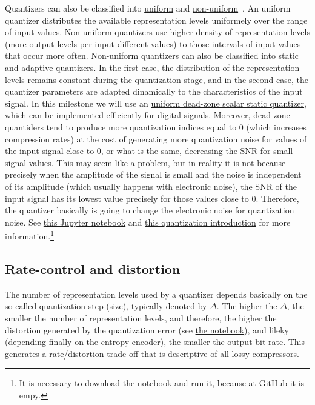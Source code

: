 Quantizers can also be classified into
\href{https://en.wikipedia.org/wiki/Quantization_(signal_processing)#Mid-riser_and_mid-tread_uniform_quantizers}{uniform}
and
\href{https://nptel.ac.in/content/storage2/courses/117104069/chapter_5/5_5.html}{non-uniform}~\cite{sayood2017introduction,vetterli2014foundations}. An
uniform quantizer distributes the available representation levels
uniformely over the range of input values. Non-uniform quantizers use
higher density of representation levels (more output levels per input
different values) to those intervals of input values that occur more
often. Non-uniform quantizers can also be classified into static and
\href{https://en.wikipedia.org/wiki/Adaptive_differential_pulse-code_modulation}{adaptive
  quantizers}. In the first case, the
\href{https://en.wikipedia.org/wiki/Probability_distribution}{distribution}
of the representation levels remains constant during the quantization
stage, and in the second case, the quantizer parameters are adapted
dinamically to the characteristics of the input signal. In this
milestone we will use an
\href{https://en.wikipedia.org/wiki/Quantization_(signal_processing)#Dead-zone_quantizers}{uniform
  dead-zone scalar static quantizer}, which can be implemented
efficiently for digital signals. Moreover, dead-zone quantiders tend
to produce more quantization indices equal to 0 (which increases
compression rates) at the cost of generating more quantization noise
for values of the input signal close to 0, or what is the same,
decreasing the \href{https://en.wikipedia.org/wiki/Signal-to-noise_ratio}{SNR} for small signal values. This may seem like a
problem, but in reality it is not because precisely when the amplitude
of the signal is small and the noise is independent of its amplitude
(which usually happens with electronic noise), the SNR of the input
signal has its lowest value precisely for those values close to
0. Therefore, the quantizer basically is going to change the
electronic noise for quantization noise. See
\href{https://github.com/vicente-gonzalez-ruiz/quantization/blob/master/digital_quantization.ipynb}{this
  Jupyter notebook}
and \href{https://vicente-gonzalez-ruiz.github.io/quantization/}{this
quantization introduction} for more information.\footnote{It is
necessary to download the notebook and run it, because at GitHub it is
empy.}


\subsection{Rate-control and distortion}
The number of representation levels used by a quantizer depends
basically on the so called quantization step (size), typically denoted by
$\Delta$. The higher the $\Delta$, the smaller the number of
representation levels, and therefore, the higher the distortion
generated by the quantization error (see
\href{https://github.com/vicente-gonzalez-ruiz/quantization/blob/master/digital_quantization.ipynb}{the
  notebook}), and lileky (depending finally on the entropy encoder),
the smaller the output bit-rate. This generates a \href{https://en.wikipedia.org/wiki/Rate%E2%80%93distortion_theory}{rate/distortion} trade-off that is descriptive of all lossy compressors.

